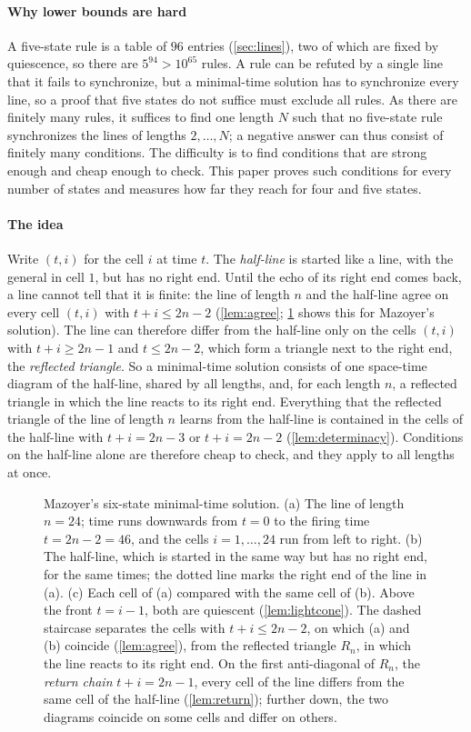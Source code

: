 \paragraph{Why lower bounds are hard}
A five-state rule is a table of $96$ entries (\cref{sec:lines}), two of which
are fixed by quiescence, so there are $5^{94}>10^{65}$ rules. A rule can be
refuted by a single line that it fails to synchronize, but a minimal-time
solution has to synchronize every line, so a proof that five states do not
suffice must exclude all rules. As there are finitely many rules, it suffices
to find one length $N$ such that no five-state rule synchronizes the lines of
lengths $2,\dots,N$; a negative answer can thus consist of finitely many
conditions. The difficulty is to find conditions that are strong enough and
cheap enough to check. This paper proves such conditions for every number of
states and measures how far they reach for four and five states.

\paragraph{The idea}
Write $(t,i)$ for the cell $i$ at time $t$. The \emph{half-line} is started like
a line, with the general in cell $1$, but has no right end. Until the echo of
its right end comes back, a line cannot tell that it is finite: the line of
length $n$ and the half-line agree on every cell $(t,i)$ with $t+i\le2n-2$
(\cref{lem:agree}; \cref{fig:line} shows this for Mazoyer's solution). The line
can therefore differ from the half-line only on the cells $(t,i)$ with
$t+i\ge2n-1$ and $t\le2n-2$, which form a triangle next to the right end, the
\emph{reflected triangle}. So a minimal-time solution consists of one
space-time diagram of the half-line, shared by all lengths, and, for each
length $n$, a reflected triangle in which the line reacts to its right end.
Everything that the reflected triangle of the line of length $n$ learns from
the half-line is contained in the cells of the half-line with $t+i=2n-3$ or
$t+i=2n-2$ (\cref{lem:determinacy}). Conditions on the half-line alone are
therefore cheap to check, and they apply to all lengths at once.

\begin{figure}[t]
\centering

\caption{Mazoyer's six-state minimal-time solution. (a) The line of length
$n=24$; time runs downwards from $t=0$ to the firing time $t=2n-2=46$, and the
cells $i=1,\dots,24$ run from left to right. (b) The half-line, which is
started in the same way but has no right end, for the same times; the dotted
line marks the right end of the line in (a). (c) Each cell of (a) compared with
the same cell of (b). Above the front $t=i-1$, both are quiescent
(\cref{lem:lightcone}). The dashed staircase separates the cells with $t+i\le
2n-2$, on which (a) and (b) coincide (\cref{lem:agree}), from the reflected
triangle $R_n$, in which the line reacts to its right end. On the first
anti-diagonal of $R_n$, the \emph{return chain} $t+i=2n-1$, every cell of the
line differs from the same cell of the half-line (\cref{lem:return}); further
down, the two diagrams coincide on some cells and differ on others.}
\label{fig:line}
\end{figure}

